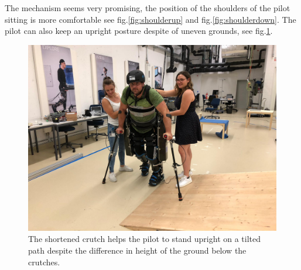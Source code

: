 The mechanism seems very promising, the position of the shoulders of the pilot sitting is more comfortable see fig.\ref{fig:shoulderup} and fig.\ref{fig:shoulderdown}. The pilot can also keep an upright posture despite of uneven grounds, see fig.\ref{fig:tilted}.


\label{pdf:requirementsLAM}

\label{pdf:spring}



\begin{figure}
    \centering
    \includegraphics[width=1\columnwidth]{Appendix/LAM/tiltedpath.jpeg}
    \caption{The shortened crutch helps the pilot to stand upright on a tilted path despite the difference in height of the ground below the crutches.}
    \label{fig:tilted}
\end{figure}


